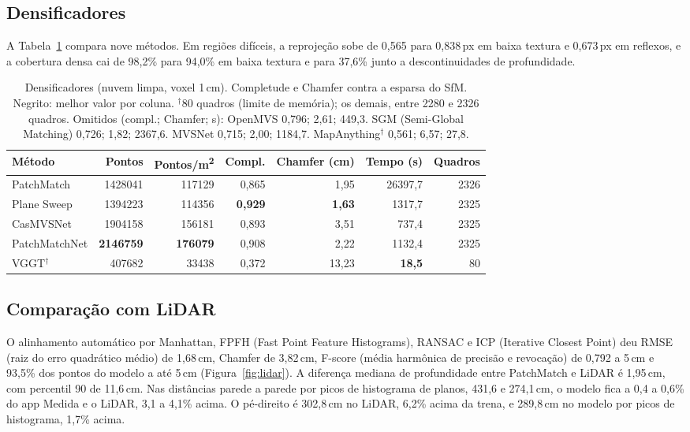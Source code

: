 \subsection{Densificadores}
A Tabela~\ref{tab:denso} compara nove métodos. Em regiões difíceis, a reprojeção sobe de 0,565 para 0,838\,px em baixa textura e 0,673\,px em reflexos, e a cobertura densa cai de 98,2\% para 94,0\% em baixa textura e para 37,6\% junto a descontinuidades de profundidade.

\begin{table}[!htbp]
\centering
\scriptsize
\setlength{\tabcolsep}{3.5pt}
\caption{Densificadores (nuvem limpa, voxel 1\,cm). Completude e Chamfer contra a esparsa do SfM. Negrito: melhor valor por coluna. $^{\dagger}$80 quadros (limite de memória); os demais, entre 2280 e 2326 quadros. Omitidos (compl.; Chamfer; s): OpenMVS 0,796; 2,61; 449,3. SGM (Semi-Global Matching) 0,726; 1,82; 2367,6. MVSNet 0,715; 2,00; 1184,7. MapAnything$^{\dagger}$ 0,561; 6,57; 27,8.}
\label{tab:denso}
\begin{tabular}{lrrrrrr}
\toprule
Método & Pontos & Pontos/m\textsuperscript{2} & Compl. & Chamfer (cm) & Tempo (s) & Quadros \\
\midrule
PatchMatch & 1428041 & 117129 & 0,865 & 1,95 & 26397,7 & 2326 \\
Plane Sweep & 1394223 & 114356 & \textbf{0,929} & \textbf{1,63} & 1317,7 & 2325 \\
CasMVSNet & 1904158 & 156181 & 0,893 & 3,51 & 737,4 & 2325 \\
PatchMatchNet & \textbf{2146759} & \textbf{176079} & 0,908 & 2,22 & 1132,4 & 2325 \\
VGGT$^{\dagger}$ & 407682 & 33438 & 0,372 & 13,23 & \textbf{18,5} & 80 \\
\bottomrule
\end{tabular}
\end{table}



\subsection{Comparação com LiDAR}
\label{sec:lidar}
O alinhamento automático por Manhattan, FPFH (Fast Point Feature Histograms), RANSAC e ICP (Iterative Closest Point) deu RMSE (raiz do erro quadrático médio) de 1,68\,cm, Chamfer de 3,82\,cm, F-score (média harmônica de precisão e revocação) de 0,792 a 5\,cm e 93,5\% dos pontos do modelo a até 5\,cm (Figura~\ref{fig:lidar}). A diferença mediana de profundidade entre PatchMatch e LiDAR é 1,95\,cm, com percentil 90 de 11,6\,cm. Nas distâncias parede a parede por picos de histograma de planos, 431,6 e 274,1\,cm, o modelo fica a 0,4 a 0,6\% do app Medida e o LiDAR, 3,1 a 4,1\% acima. O pé-direito é 302,8\,cm no LiDAR, 6,2\% acima da trena, e 289,8\,cm no modelo por picos de histograma, 1,7\% acima.

